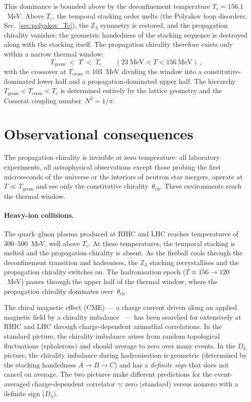 This dominance is bounded above by the deconfinement temperature $T_c = 156.1$~MeV.  Above $T_c$, the temporal stacking order melts (the Polyakov loop disorders, Sec.~\ref{sec:polyakov_Tc}), the $\mathbb{Z}_3$ symmetry is restored, and the propagation chirality vanishes: the geometric handedness of the stacking sequence is destroyed along with the stacking itself.  The propagation chirality therefore exists only within a narrow thermal window:
\begin{equation}
T_{\text{geom}} \;<\; T \;<\; T_c \qquad (23~\text{MeV} < T < 156~\text{MeV})\,,
\label{eq:thermal_window}
\end{equation}
with the crossover at $T_{\text{cross}} \approx 103$~MeV dividing the window into a constitutive-dominated lower half and a propagation-dominated upper half.  The hierarchy $T_{\text{geom}} < T_{\text{cross}} < T_c$ is determined entirely by the lattice geometry and the Cosserat coupling number~$N^2 = 1/\pi$.


\section{Observational consequences}
\label{sec:d4_observational}

The propagation chirality is invisible at zero temperature: all laboratory experiments, all astrophysical observations except those probing the first microseconds of the universe or the interiors of neutron star mergers, operate at $T \ll T_{\text{geom}}$ and see only the constitutive chirality~$\theta_{\text{ch}}$.  Three environments reach the thermal window.

\paragraph{Heavy-ion collisions.}  The quark--gluon plasma produced at RHIC and LHC reaches temperatures of $300$--$500$~MeV, well above $T_c$.  At these temperatures, the temporal stacking is melted and the propagation chirality is absent.  As the fireball cools through the deconfinement transition and hadronises, the $\mathbb{Z}_3$ stacking recrystallises and the propagation chirality switches on.  The hadronisation epoch ($T \approx 156 \to 120$~MeV) passes through the upper half of the thermal window, where the propagation chirality dominates over~$\theta_{\text{ch}}$.

The chiral magnetic effect (CME) --- a charge current driven along an applied magnetic field by a chirality imbalance~\cite{Kharzeev2008,Fukushima2008} --- has been searched for extensively at RHIC and LHC through charge-dependent azimuthal correlations.  In the standard picture, the chirality imbalance arises from random topological fluctuations (sphalerons) and should average to zero over many events.  In the $D_4$ picture, the chirality imbalance during hadronisation is geometric (determined by the stacking handedness $A \to B \to C$) and has a \textit{definite sign} that does not cancel on average.  The two pictures make different predictions for the event-averaged charge-dependent correlator $\gamma$: zero (standard) versus nonzero with a definite sign ($D_4$).

